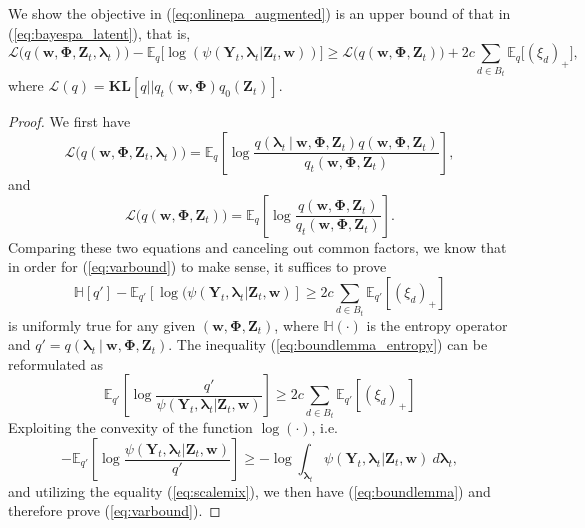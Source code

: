 \documentclass[twoside,11pt]{article}
\newcommand{\Yv}{\bm{Y}}
\newcommand{\Zv}{\bm{Z}}
\newcommand{\wv}{\bm{w}}
\newcommand{\Phiv}{\bm{\Phi}}
\newcommand{\lambdav}{\bm \lambda}
\newcommand{\KL}{\textbf{KL}}
\begin{document}
\section{}\label{app:upperbound}
We show the objective in (\ref{eq:onlinepa_augmented}) is an upper bound of that in (\ref{eq:bayespa_latent}), that is,
\begin{equation} \label{eq:varbound}
\mathcal{L}\Big( q( \wv, \Phiv, \Zv_t, \lambdav_t) \Big) -\mathbb{E}_q\Big[ \log(\psi(\Yv_t, \lambdav_t | \Zv_t, \wv)) \Big] \geq \mathcal{L}\Big( q( \wv, \Phiv, \Zv_t) \Big) + 2 c \sum\limits_{d \in B_t}{\mathbb{E}_q\Big[ (\xi_d)_+ \Big]},
\end{equation}
where $\mathcal{L}(q) = \KL[q || q_t(\wv, \Phiv) q_0(\Zv_t)]$.

\begin{proof}
We first have
\begin{equation*}
\mathcal{L}\Big( q(\wv, \Phiv, \Zv_t, \lambdav_t) \Big) = \mathbb{E}_q\left[ \log \frac{q(\lambdav_t ~|~ \wv, \Phiv, \Zv_t) q(\wv, \Phiv, \Zv_t)}{q_t(\wv, \Phiv, \Zv_t)} \right],
\end{equation*}
and
\begin{equation*}
\mathcal{L}\Big( q(\wv, \Phiv, \Zv_t) \Big) = \mathbb{E}_q\left[ \log \frac{q(\wv, \Phiv, \Zv_t)}{q_t(\wv, \Phiv, \Zv_t)} \right].
\end{equation*}
Comparing these two equations and canceling out common factors, we know that in order for (\ref{eq:varbound}) to make sense, it suffices to prove
\begin{equation}\label{eq:boundlemma_entropy}
\mathbb{H}[q']-\mathbb{E}_{q'}[\log(\psi(\Yv_t, \lambdav_t | \Zv_t, \wv)] \geq 2 c \sum\limits_{d \in B_t}{\mathbb{E}_{q'}[(\xi_d)_+]}
\end{equation}
is uniformly true for any given $(\wv, \Phiv, \Zv_t)$, where $\mathbb{H}(\cdot)$ is the entropy operator and $q' = q(\lambdav_t ~|~ \wv, \Phiv, \Zv_t)$. The inequality (\ref{eq:boundlemma_entropy}) can be reformulated as
\begin{equation} \label{eq:boundlemma}
\mathbb{E}_{q'}\left[ \log \frac{q'}{\psi(\Yv_t, \lambdav_t | \Zv_t, \wv)} \right] \geq 2c \sum\limits_{d \in B_t}{\mathbb{E}_{q'}[(\xi_d)_+]}
\end{equation}
Exploiting the convexity of the function $\log(\cdot)$, i.e.
\small
\begin{equation*}
-\mathbb{E}_{q'}\left[ \log \frac{\psi(\Yv_t, \lambdav_t | \Zv_t, \wv)}{q'} \right]  \geq -\log \int_{\lambdav_t}{\psi(\Yv_t, \lambdav_t | \Zv_t, \wv) ~d\lambdav_t},
\end{equation*}
\normalsize
and utilizing the equality (\ref{eq:scalemix}), we then have (\ref{eq:boundlemma}) and therefore prove (\ref{eq:varbound}).
\end{proof}

\vskip 0.2in


\end{document}
